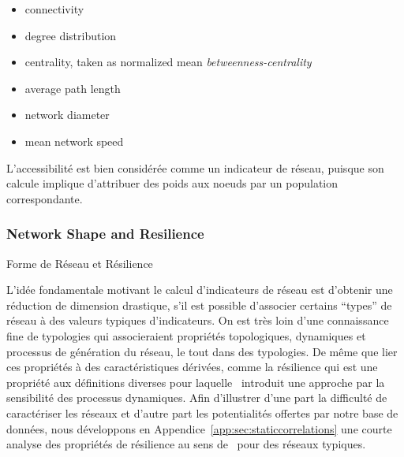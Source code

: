 



\begin{itemize}
\item connectivity
\item degree distribution
\item centrality, taken as normalized mean \emph{betweenness-centrality}
\item average path length
\item network diameter
\item mean network speed
\end{itemize}


L'accessibilité est bien considérée comme un indicateur de réseau, puisque son calcule implique d'attribuer des poids aux noeuds par un population correspondante.




\subsubsection{Network Shape and Resilience}{Forme de Réseau et Résilience}

L'idée fondamentale motivant le calcul d'indicateurs de réseau est d'obtenir une réduction de dimension drastique, s'il est possible d'associer certains ``types'' de réseau à des valeurs typiques d'indicateurs. On est très loin d'une connaissance fine de typologies qui associeraient propriétés topologiques, dynamiques et processus de génération du réseau, le tout dans des typologies. De même que lier ces propriétés à des caractéristiques dérivées, comme la résilience qui est une propriété aux définitions diverses pour laquelle~\cite{Gao:2016ty} introduit une approche par la sensibilité des processus dynamiques. Afin d'illustrer d'une part la difficulté de caractériser les réseaux et d'autre part les potentialités offertes par notre base de données, nous développons en Appendice~\ref{app:sec:staticcorrelations} une courte analyse des propriétés de résilience au sens de~\cite{} pour des réseaux typiques.



